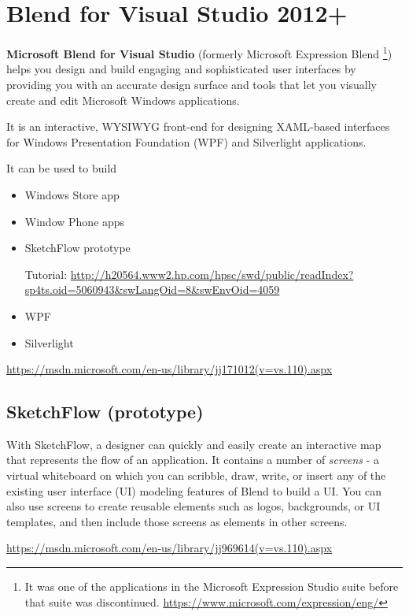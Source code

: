\chapter{Blend for Visual Studio 2012+}
\label{chap:Blend_VisualStudio}

{\bf Microsoft Blend for Visual Studio} (formerly Microsoft Expression Blend
\footnote{It was one of the applications in the Microsoft Expression Studio
suite before that suite was discontinued.
\url{https://www.microsoft.com/expression/eng/}}) helps you design and build
engaging and sophisticated user interfaces by providing you with an accurate
design surface and tools that let you visually create and edit Microsoft Windows
applications.

It is an interactive, WYSIWYG front-end for designing XAML-based interfaces for
Windows Presentation Foundation (WPF) and Silverlight applications.

It can be used to build
\begin{itemize}
  \item Windows Store app
  
  \item Window Phone apps
  
  \item SketchFlow prototype

Tutorial:
\url{http://h20564.www2.hp.com/hpsc/swd/public/readIndex?sp4ts.oid=5060943&swLangOid=8&swEnvOid=4059}
  
  \item WPF 
  
  \item Silverlight
\end{itemize}


\url{https://msdn.microsoft.com/en-us/library/jj171012(v=vs.110).aspx}

\section{SketchFlow (prototype)}
\label{sec:SketchFlow}

With SketchFlow, a designer can quickly and easily create an interactive map
that represents the flow of an application.
It contains a number of {\it screens} - a virtual whiteboard
 on which you can scribble, draw, write, or insert any of the existing user
interface (UI) modeling features of Blend to build a UI. You can also use
screens to create reusable elements such as logos, backgrounds, or UI templates,
and then include those screens as elements in other screens.


\url{https://msdn.microsoft.com/en-us/library/jj969614(v=vs.110).aspx}